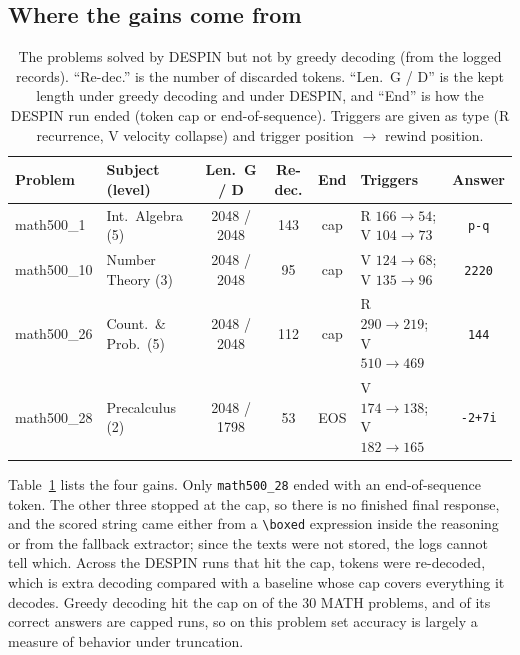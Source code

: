 \documentclass[11pt]{article}
\begin{document}
\subsection{Where the gains come from}

\begin{table}[t]
\centering
\caption{The \statRescueCount{} problems solved by DESPIN but not by greedy decoding (from the logged records). ``Re-dec.'' is the number of discarded tokens. ``Len.\ G / D'' is the kept length under greedy decoding and under DESPIN, and ``End'' is how the DESPIN run ended (token cap or end-of-sequence). Triggers are given as type (R recurrence, V velocity collapse) and trigger position $\to$ rewind position.}
\label{tab:rescues}
\footnotesize
\setlength{\tabcolsep}{3pt}
\begin{tabular}{llccclc}
\toprule
Problem & Subject (level) & Len.\ G / D & Re-dec. & End & Triggers & Answer \\
\midrule
math500\_1 & Int.\ Algebra (5) & 2048 / 2048 & 143 & cap & R $166\!\to\!54$; V $104\!\to\!73$ & \texttt{p-q} \\
math500\_10 & Number Theory (3) & 2048 / 2048 & 95 & cap & V $124\!\to\!68$; V $135\!\to\!96$ & \texttt{2220} \\
math500\_26 & Count.\ \& Prob.\ (5) & 2048 / 2048 & 112 & cap & R $290\!\to\!219$; V $510\!\to\!469$ & \texttt{144} \\
math500\_28 & Precalculus (2) & 2048 / 1798 & 53 & EOS & V $174\!\to\!138$; V $182\!\to\!165$ & \texttt{-2+7i} \\
\bottomrule
\end{tabular}
\end{table}

Table~\ref{tab:rescues} lists the four gains. Only \texttt{math500\_28} ended with an end-of-sequence token. The other three stopped at the cap, so there is no finished final response, and the scored string came either from a \texttt{\textbackslash boxed} expression inside the reasoning or from the fallback extractor; since the texts were not stored, the logs cannot tell which. Across the \statDespinCappedN{} DESPIN runs that hit the cap, \statPrunedInCappedDespin{} tokens were re-decoded, which is extra decoding compared with a baseline whose cap covers everything it decodes. Greedy decoding hit the cap on \statGreedyCapHits{} of the 30 MATH problems, and \statGreedyCorrectCapped{} of its \statGreedyCorrect{} correct answers are capped runs, so on this problem set accuracy is largely a measure of behavior under truncation.
\end{document}
